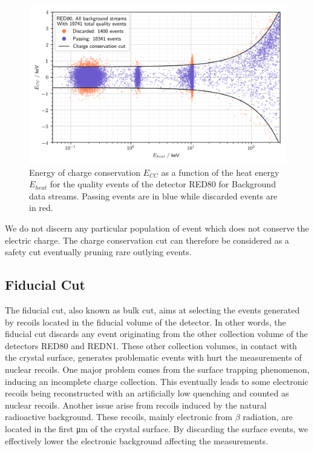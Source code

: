 \begin{figure}
\centering
\includegraphics[width=\linewidth,]{Figures/Neutron/charge_conservation.png}
\caption{Energy of charge conservation $E_{CC}$ as a function of the heat energy $E_{heat}$ for the quality events of the detector RED80 for Background data streams. Passing events are in blue while discarded events are in red.}
\label{fig:charge-conservation}
\end{figure}

We do not discern any particular population of event which does not conserve the electric charge. The charge conservation cut can therefore be considered as a safety cut eventually pruning rare outlying events.


\subsection{Fiducial Cut}
\label{par:fiducial-cut}

The fiducial cut, also known as bulk cut, aims at selecting the events generated by recoils located in the fiducial volume of the detector. In other words, the fiducial cut discards any event originating from the other collection volume of the detectors RED80 and REDN1. These other collection volumes, in contact with the crystal surface, generates problematic events with hurt the measurements of nuclear recoils.
One major problem comes from the surface trapping phenomenon, inducing an incomplete charge collection. This eventually leads to some electronic recoils being reconstructed with an artificially low quenching and counted as nuclear recoils.
Another issue arise from recoils induced by the natural radioactive background. These recoils, mainly electronic from $\beta$ radiation, are located in the first \si{\micro\meter} of the crystal surface. By discarding the surface events, we effectively lower the electronic background affecting the measurements.

